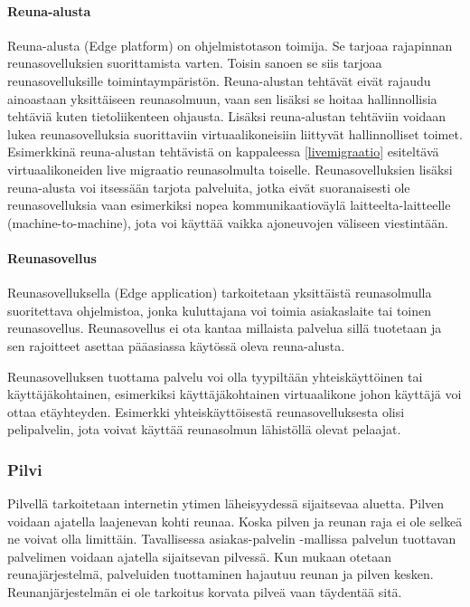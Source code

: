 \paragraph{Reuna-alusta}
Reuna-alusta (Edge platform) on ohjelmistotason toimija. Se tarjoaa rajapinnan reunasovelluksien suorittamista varten. Toisin sanoen se siis tarjoaa reunasovelluksille toimintaympäristön.
Reuna-alustan tehtävät eivät rajaudu ainoastaan yksittäiseen reunasolmuun, vaan sen lisäksi se hoitaa hallinnollisia tehtäviä kuten tietoliikenteen ohjausta. Lisäksi reuna-alustan tehtäviin voidaan lukea reunasovelluksia suorittaviin virtuaalikoneisiin liittyvät hallinnolliset toimet. Esimerkkinä reuna-alustan tehtävistä on kappaleessa \ref{livemigraatio} esiteltävä virtuaalikoneiden live migraatio reunasolmulta toiselle.
Reunasovelluksien lisäksi reuna-alusta voi itsessään tarjota palveluita, jotka eivät suoranaisesti ole reunasovelluksia vaan esimerkiksi nopea kommunikaatioväylä laitteelta-laitteelle (machine-to-machine), jota voi käyttää vaikka ajoneuvojen väliseen viestintään.

\paragraph{Reunasovellus}
Reunasovelluksella (Edge application) tarkoitetaan yksittäistä reunasolmulla suoritettava ohjelmistoa, jonka kuluttajana voi toimia asiakaslaite tai toinen reunasovellus. Reunasovellus ei ota kantaa millaista palvelua sillä tuotetaan ja sen rajoitteet asettaa pääasiassa käytössä oleva reuna-alusta. 

Reunasovelluksen tuottama palvelu voi olla tyypiltään yhteiskäyttöinen tai käyttäjäkohtainen, esimerkiksi käyttäjäkohtainen virtuaalikone johon käyttäjä voi ottaa etäyhteyden. Esimerkki yhteiskäyttöisestä reunasovelluksesta olisi pelipalvelin, jota voivat käyttää reunasolmun lähistöllä olevat pelaajat. 

\subsubsection{Pilvi}
Pilvellä tarkoitetaan internetin ytimen läheisyydessä sijaitsevaa aluetta.
Pilven voidaan ajatella laajenevan kohti reunaa. Koska pilven ja reunan raja ei ole selkeä ne voivat olla limittäin.
Tavallisessa asiakas-palvelin -mallissa palvelun tuottavan palvelimen voidaan ajatella sijaitsevan pilvessä. Kun mukaan otetaan reunajärjestelmä, palveluiden tuottaminen hajautuu reunan ja pilven kesken. Reunanjärjestelmän ei ole tarkoitus korvata pilveä vaan täydentää sitä. 


